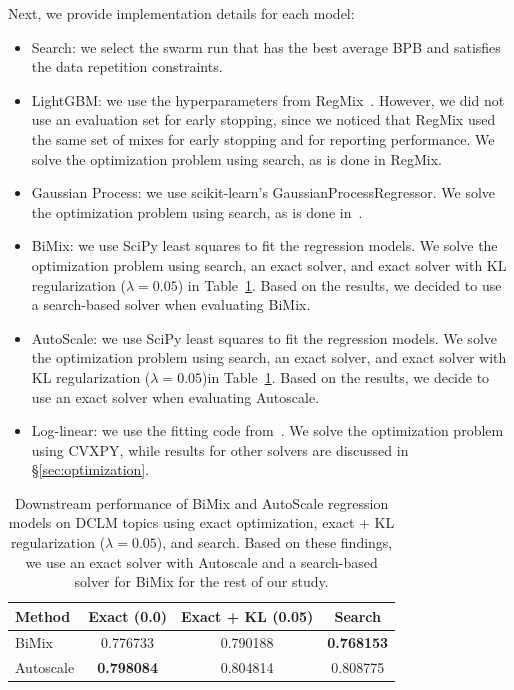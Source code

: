 \documentclass[table]{ai2style/ai2}
\begin{document}
Next, we provide implementation details for each model:
\begin{itemize}
    \item Search: we select the swarm run that has the best average BPB and satisfies the data repetition constraints.
    \item LightGBM: we use the hyperparameters from RegMix~\citep{liu2025regmixdatamixtureregression}. However, we did not use an evaluation set for early stopping, since we noticed that RegMix used the same set of mixes for early stopping and for reporting performance. We solve the optimization problem using search, as is done in RegMix.
    \item Gaussian Process: we use scikit-learn's GaussianProcessRegressor. We solve the optimization problem using search, as is done in~\citet{chen2025admirebayesoptaccelerateddatamixture}.
    \item BiMix: we use SciPy least squares to fit the regression models. We solve the optimization problem using search, an exact solver, and exact solver with KL regularization ($\lambda = 0.05$) in Table~\ref{tab:bimix_autoscale_solvers}. Based on the results, we decided to use a search-based solver when evaluating BiMix.
    \item AutoScale: we use SciPy least squares to fit the regression models. We solve the optimization problem using search, an exact solver, and exact solver with KL regularization ($\lambda = 0.05$)in Table~\ref{tab:bimix_autoscale_solvers}. Based on the results, we decide to use an exact solver when evaluating Autoscale.
    \item Log-linear: we use the fitting code from~\citet{ye2025datamixinglawsoptimizing}. We solve the optimization problem using CVXPY, while results for other solvers are discussed in \S\ref{sec:optimization}.
\end{itemize}

\begin{table}[t]
\centering
\small
\caption{Downstream performance of BiMix and AutoScale regression models on DCLM topics using exact optimization, exact + KL regularization ($\lambda = 0.05$), and search. Based on these findings, we use an exact solver with Autoscale and a search-based solver for BiMix for the rest of our study.}
\begin{tabular}{lccc}
\toprule
\textbf{Method} & \textbf{Exact (0.0)} & \textbf{Exact + KL (0.05)} & \textbf{Search} \\
\midrule
BiMix      & 0.776733 & 0.790188 & \textbf{0.768153} \\
Autoscale  & \textbf{0.798084} & 0.804814 & 0.808775 \\
\bottomrule
\end{tabular}
\label{tab:bimix_autoscale_solvers}
\end{table}
\end{document}
